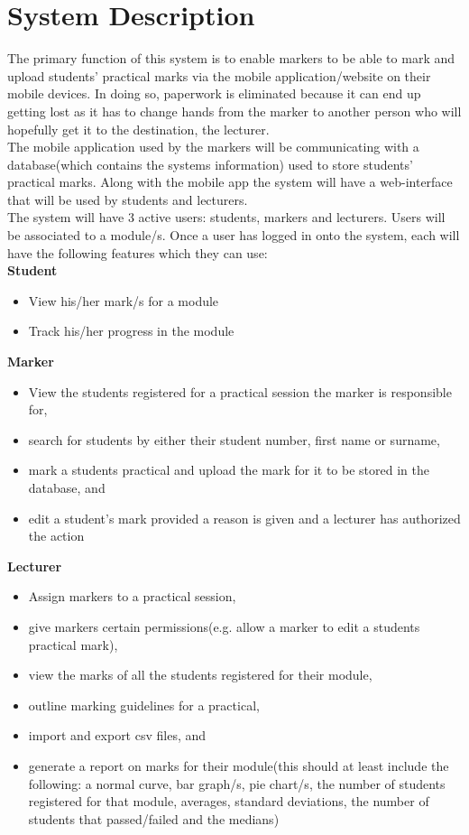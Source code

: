 \documentclass[11pt,a4paper]{article}
\begin{document}
\section{System Description}
The primary function of this system is to enable markers to be able to mark and upload students' practical marks via the mobile application/website on their mobile devices. In doing so, paperwork is eliminated because it can end up getting lost as it has to change hands from the marker to another person who will hopefully get it to the destination, the lecturer.\\ 

The mobile application used by the markers will be communicating with a database(which contains the systems information) used to store students' practical marks. Along with the mobile app the system will have a web-interface that will be used by students and lecturers.\\

The system will have 3 active users: students, markers and lecturers.
Users will be associated to a module/s. Once a user has logged in onto the system, each will have the following features which they can use:\\

\textbf{Student}
\begin{itemize} 
\item View his/her mark/s for a module
\item Track his/her progress in the module
\end{itemize} 

\textbf{Marker}
\begin{itemize} 
\item View the students registered for a practical session the marker is responsible for,
\item search for students by either their student number, first name or surname,
\item mark a students practical and upload the mark for it to be stored in the database, and
\item edit a student's mark provided a reason is given and a lecturer has authorized the action
\end{itemize} 

\textbf{Lecturer}
\begin{itemize}  
\item Assign markers to a practical session,
\item give markers certain permissions(e.g. allow a marker to edit a students practical mark),
\item view the marks of all the students registered for their module,
\item outline marking guidelines for a practical,
\item import and export csv files, and
\item generate a report on marks for their module(this should at least include the following: a normal curve, bar graph/s, pie chart/s, the number of students registered for that module, averages, standard deviations, the number of students that passed/failed and the medians)   
\end{itemize}
\end{document}
